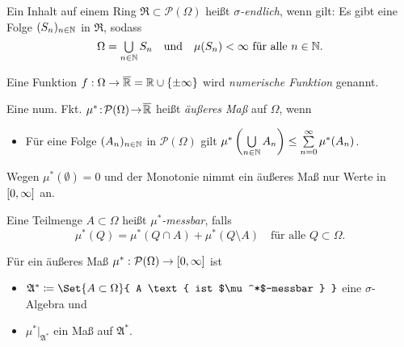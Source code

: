 \documentclass{cheat-sheet}
\newcommand{\PS}{\mathcal{P}} %
\newcommand{\PSO}{\PS(\Omega)} %
\newcommand{\Alg}{\mathfrak{A}} %
\newcommand{\Ring}{\mathfrak{R}} %
\theoremstyle{definition}
\begin{document}

\begin{defn}
  Ein Inhalt auf einem Ring $\Ring \subset \PSO$ heißt \emph{$\sigma$-endlich}, wenn gilt: Es gibt eine Folge $(S_n)_{n \in \mathbb{N}}$ in $\Ring$, sodass
  \[
      \Omega = \bigcup_{n \in \N} S_n
      \quad \text{und} \quad
      \mu(S_n) < \infty \text{ für alle } n \in \N.
  \]
\end{defn}

\begin{defn}
  Eine Funktion $f : \Omega \to \overline{\mathbb{R}} = \mathbb{R} \cup \{ \pm \infty \}$ wird \emph{numerische Funktion} genannt.
\end{defn}

\begin{defn}
  Eine num. Fkt. $\mu^* \!:\! \PSO \!\to\! \overline{\R}$ heißt \emph{äußeres Maß} auf $\Omega$, wenn
  \begin{itemize}
    \item Für eine Folge $(A_n)_{n \in \mathbb{N}}$ in $\mathcal{P}(\Omega)$ gilt $\mu^*\left(\bigcup_{n \in \N} A_n \right) \leq \sum_{n = 0}^\infty \mu^*(A_n)$. %
  \end{itemize}
\end{defn}

\begin{bem}
  Wegen $\mu^*(\emptyset) = 0$ und der Monotonie nimmt ein äußeres Maß nur Werte in $\left[ 0, \infty \right]$ an.
\end{bem}

\begin{defn}
  Eine Teilmenge $A \subset \Omega$ heißt \emph{$\mu^*$-messbar}, falls
  \[ \mu^*(Q) = \mu^*(Q \cap A) + \mu^*(Q \setminus A) \quad \text{für alle } Q \subset \Omega. \]
\end{defn}

\begin{satz}
  Für ein äußeres Maß $\mu^* : \PSO \to \cinterval{0}{\infty}$ ist
  \begin{itemize}
    \item $\Alg^* \coloneqq \Set{ A \subset \Omega }{ A \text{ ist $\mu^*$-messbar } }$ eine $\sigma$-Algebra und
    \item $\mu^*|_{\Alg^*}$ ein Maß auf $\Alg^*$.
  \end{itemize}
\end{satz}
\end{document}

